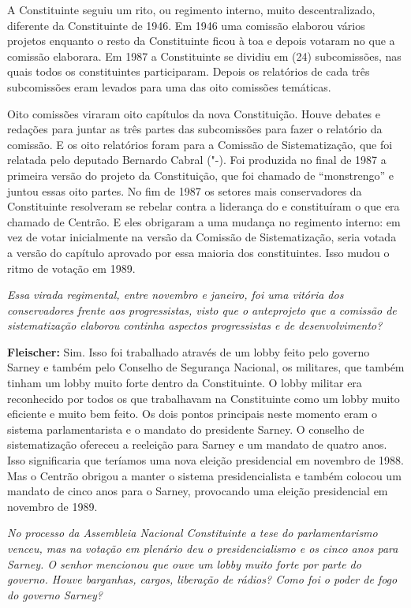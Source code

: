 A Constituinte seguiu um rito, ou regimento interno, muito
descentralizado, diferente da Constituinte de 1946. Em 1946 uma comissão
elaborou vários projetos enquanto o resto da Constituinte ficou à toa e
depois votaram no que a comissão elaborara. Em 1987 a Constituinte se
dividiu em (24) subcomissões, nas quais todos os constituintes
participaram. Depois os relatórios de cada três subcomissões eram
levados para uma das oito comissões temáticas.

Oito comissões viraram oito capítulos da nova Constituição. Houve
debates e redações para juntar as três partes das subcomissões para
fazer o relatório da comissão. E os oito relatórios foram para a
Comissão de Sistematização, que foi relatada pelo deputado Bernardo
Cabral ("-). Foi produzida no final de 1987 a primeira versão do
projeto da Constituição, que foi chamado de ``monstrengo'' e juntou
essas oito partes. No fim de 1987 os setores mais conservadores da
Constituinte resolveram se rebelar contra a liderança do  e
constituíram o que era chamado de Centrão. E eles obrigaram a uma
mudança no regimento interno: em vez de votar inicialmente na versão da
Comissão de Sistematização, seria votada a versão do capítulo aprovado
por essa maioria dos constituintes. Isso mudou o ritmo de votação em
1989.

\emph{Essa virada regimental, entre novembro e janeiro, foi uma
vitória dos conservadores frente aos progressistas, visto que o
anteprojeto que a comissão de sistematização elaborou continha aspectos
progressistas e de desenvolvimento?}

\textbf{Fleischer:} Sim. Isso foi trabalhado através de um lobby feito
pelo governo Sarney e também pelo Conselho de Segurança Nacional, os
militares, que também tinham um lobby muito forte dentro da
Constituinte. O lobby militar era reconhecido por todos os que
trabalhavam na Constituinte como um lobby muito eficiente e muito bem
feito. Os dois pontos principais neste momento eram o sistema
parlamentarista e o mandato do presidente Sarney. O conselho de
sistematização ofereceu a reeleição para Sarney e um mandato de quatro
anos. Isso significaria que teríamos uma nova eleição presidencial em
novembro de 1988. Mas o Centrão obrigou a manter o sistema
presidencialista e também colocou um mandato de cinco anos para o
Sarney, provocando uma eleição presidencial em novembro de 1989.

\emph{No processo da Assembleia Nacional Constituinte a tese do
parlamentarismo venceu, mas na votação em plenário deu o
presidencialismo e os cinco anos para Sarney. O senhor mencionou que
ouve um lobby muito forte por parte do governo. Houve barganhas, cargos,
liberação de rádios? Como foi o poder de fogo do governo Sarney?}

